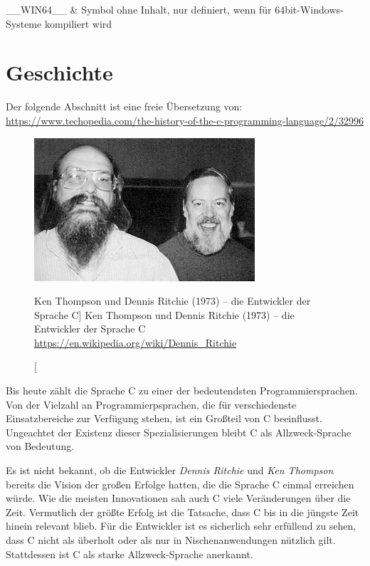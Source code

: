 \begin{appendices}
\begin{table}[h!]
\begin{tabularx}
	\_\_WIN64\_\_  &
	Symbol ohne Inhalt, nur definiert, wenn für 64bit-Windows-Systeme kompiliert wird
	\\
	
	\bottomrule[1.5pt]
\end{tabularx}
\caption{Vordefinierte Präprozessor-Symbole des \texttt{gcc}} \label{tab:predefinedMacros}
\end{table}

\chapter{Geschichte}
Der folgende Abschnitt ist eine freie Übersetzung von:\\
\url{https://www.techopedia.com/the-history-of-the-c-programming-language/2/32996}

\begin{figure}
	\includegraphics[width=\linewidth]{./gfx/KTDR}
	\caption%
		[Ken Thompson und Dennis Ritchie (1973) -- die Entwickler der Sprache C]
		{Ken Thompson und Dennis Ritchie (1973) -- die Entwickler der Sprache C\newline
		\url{https://en.wikipedia.org/wiki/Dennis_Ritchie}}
	\vspace{-20pt}
\end{figure}
Bis heute zählt die Sprache C zu einer der bedeutendsten Programmiersprachen. Von der Vielzahl an  Programmierpsprachen, die für verschiedenste Einsatzbereiche zur Verfügung stehen, ist ein Großteil von C beeinflusst. Ungeachtet der Existenz dieser Spezialisierungen bleibt C als Allzweck-Sprache von Bedeutung.

Es ist nicht bekannt, ob die Entwickler \emph{Dennis Ritchie} und \emph{Ken Thompson} bereits die Vision der großen Erfolge hatten, die die Sprache C einmal erreichen würde. Wie die meisten Innovationen sah auch C viele Veränderungen über die Zeit. Vermutlich der größte Erfolg ist die Tatsache, dass C bis in die jüngste Zeit hinein relevant blieb. Für die Entwickler ist es sicherlich sehr erfüllend zu sehen, dass C nicht als überholt oder als nur in Nischenanwendungen nützlich gilt. Stattdessen ist C als starke Allzweck-Sprache anerkannt.


\end{appendices}
